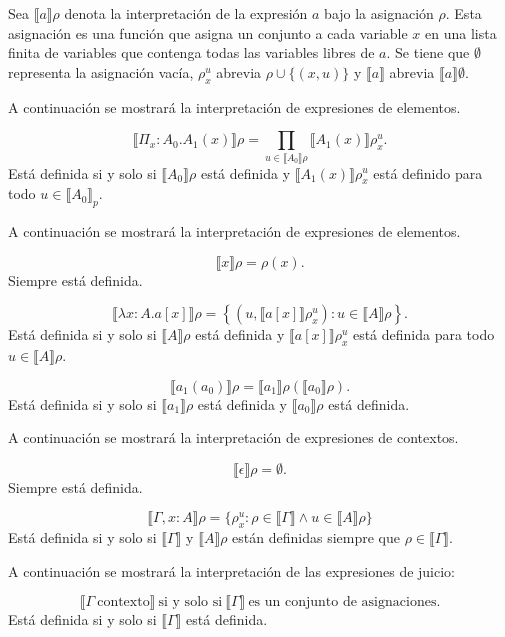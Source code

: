 \documentclass[11pt,oneside]{report}
\theoremstyle{plain}
\theoremstyle{definition}
\begin{document}
Sea $\llbracket a \rrbracket\rho$ denota la interpretación de la expresión $a$ bajo la asignación $\rho$. Esta asignación es una función que asigna un conjunto a cada variable $x$ en una lista finita de variables que contenga todas las variables libres de $a$. Se tiene que \(\emptyset\) representa la asignación vacía, \(\rho_{x}^{u}\) abrevia \(\rho\cup\{(x,u)\}\) y \(\llbracket a \rrbracket\) abrevia \(\llbracket a \rrbracket\emptyset\).

A continuación se mostrará la interpretación de expresiones de elementos.

    $$\llbracket \Pi_x : A_0. A_1(x) \rrbracket\rho = \prod_{u \in \llbracket A_0 \rrbracket\rho} \llbracket A_1(x) \rrbracket\rho_{x}^{u}.$$
    Está definida si y solo si $\llbracket A_0 \rrbracket \rho$ está definida y $\llbracket A_1(x) \rrbracket \rho ^{u}_x$ está definido para todo $u \in \llbracket A_0 \rrbracket_p$.

A continuación se mostrará la interpretación de expresiones de elementos.

    $$\llbracket x \rrbracket\rho = \rho(x).$$
    Siempre está definida.

    $$\llbracket \lambda x : A. a[x] \rrbracket\rho = \left\{ \left( u, \llbracket a[x] \rrbracket\rho_{x}^{u} \right) : u \in \llbracket A \rrbracket\rho \right\}.$$
    Está definida si y solo si $\llbracket A \rrbracket\rho$ está definida y $\llbracket a[x] \rrbracket\rho_{x}^{u}$ está definida para todo $u \in \llbracket A \rrbracket\rho$.

    $$\llbracket a_1(a_0) \rrbracket\rho = \llbracket a_1 \rrbracket\rho\left( \llbracket a_0 \rrbracket\rho \right).$$
    Está definida si y solo si $\llbracket a_1 \rrbracket\rho$ está definida y $\llbracket a_0 \rrbracket\rho$ está definida.

A continuación se mostrará la interpretación de expresiones de contextos.

    $$\llbracket \epsilon \rrbracket\rho = \emptyset.$$
    Siempre está definida.

    $$\llbracket \Gamma, x : A \rrbracket\rho = \{ \rho_{x}^{u} :\rho\in\llbracket\Gamma\rrbracket \land u \in \llbracket A \rrbracket\rho \}$$
    Está definida si y solo si $\llbracket\Gamma\rrbracket$ y $\llbracket A \rrbracket\rho$ están definidas siempre que $\rho\in\llbracket\Gamma\rrbracket$.

A continuación se mostrará la interpretación de las expresiones de juicio:

    \begin{equation*}
    \llbracket\Gamma \ \text{contexto}\rrbracket \ \text{si y solo si} \ \llbracket\Gamma\rrbracket \ \text{es un conjunto de asignaciones.}
    \end{equation*}
    Está definida si y solo si $\llbracket\Gamma\rrbracket$ está definida.
\end{document}
